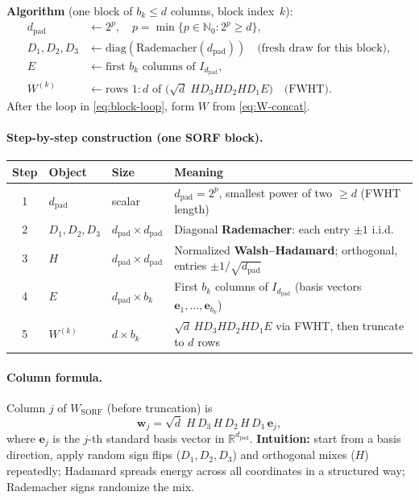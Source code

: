 \documentclass[11pt]{article}
\begin{document}
\textbf{Algorithm} (one block of $b_k\le d$ columns, block index~$k$):
\begin{align}
  d_{\mathrm{pad}} &\leftarrow 2^{p},\quad
  p=\min\bigl\{p\in\mathbb{N}_0 : 2^{p}\ge d\bigr\}, \\
  D_1,D_2,D_3 &\leftarrow \mathrm{diag}(\text{Rademacher}(d_{\mathrm{pad}}))
  \quad\text{(fresh draw for this block)}, \\
  E &\leftarrow \text{first } b_k \text{ columns of } I_{d_{\mathrm{pad}}}, \\
  W^{(k)} &\leftarrow \text{rows } 1{:}d \text{ of }
  \bigl(\sqrt{d}\; H D_3 H D_2 H D_1 E\bigr)
  \quad\text{(FWHT)}.
\end{align}
After the loop in \eqref{eq:block-loop}, form $W$ from \eqref{eq:W-concat}.

\paragraph{Step-by-step construction (one SORF block).}
\begin{center}
\renewcommand{\arraystretch}{1.35}
\begin{tabular}{@{}clll@{}}
\toprule
\textbf{Step} & \textbf{Object} & \textbf{Size} & \textbf{Meaning} \\
\midrule
1 & $d_{\mathrm{pad}}$ & scalar & $d_{\mathrm{pad}}=2^{p}$, smallest power of two $\ge d$ (FWHT length) \\
2 & $D_1,D_2,D_3$ & $d_{\mathrm{pad}}\times d_{\mathrm{pad}}$ & Diagonal \textbf{Rademacher}: each entry $\pm1$ i.i.d. \\
3 & $H$ & $d_{\mathrm{pad}}\times d_{\mathrm{pad}}$ & Normalized \textbf{Walsh--Hadamard}; orthogonal, entries $\pm1/\sqrt{d_{\mathrm{pad}}}$ \\
4 & $E$ & $d_{\mathrm{pad}}\times b_k$ & First $b_k$ columns of $I_{d_{\mathrm{pad}}}$ (basis vectors $\mathbf e_1,\ldots,\mathbf e_{b_k}$) \\
5 & $W^{(k)}$ & $d\times b_k$ & $\sqrt{d}\,H D_3 H D_2 H D_1 E$ via FWHT, then truncate to $d$ rows \\
\bottomrule
\end{tabular}
\end{center}

\paragraph{Column formula.}
Column $j$ of $W_{\mathrm{SORF}}$ (before truncation) is
\begin{equation}
  \label{eq:sorf-column}
  \boxed{
  \mathbf w_j
  = \sqrt{d}\; H\, D_3\, H\, D_2\, H\, D_1\, \mathbf e_j,
  }
\end{equation}
where $\mathbf e_j$ is the $j$-th standard basis vector in $\mathbb{R}^{d_{\mathrm{pad}}}$.
\textbf{Intuition:} start from a basis direction, apply random sign flips ($D_1,D_2,D_3$) and orthogonal mixes ($H$) repeatedly;
Hadamard spreads energy across all coordinates in a structured way; Rademacher signs randomize the mix.
\end{document}
